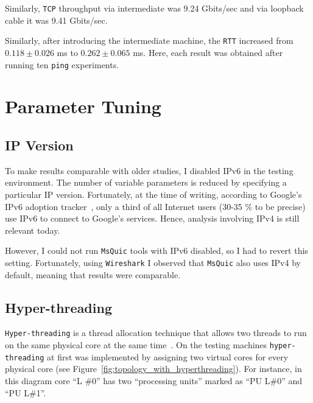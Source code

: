 \documentclass[12pt,a4paper]{report}
\begin{document}
    Similarly, \texttt{TCP} throughput via intermediate was 9.24 Gbits/sec and via loopback cable it was 9.41 Gbits/sec.


    Similarly, after introducing the intermediate machine, the \texttt{RTT} increased from
    $0.118 \pm 0.026$ ms to $0.262 \pm 0.065$ ms.
    Here, each result was obtained after running ten \texttt{ping} experiments.
    




\section{Parameter Tuning}

\subsection{IP Version}

To make results comparable with older studies, I disabled IPv6 in the testing environment.
The number of variable parameters is reduced by specifying a particular IP version.
Fortunately, at the time of writing, according to Google's IPv6 adoption tracker~\cite{IPv6_Adoption_Statistics}, only a third of all Internet users (30-35 \% to be precise) use IPv6 to connect to Google's services.
Hence, analysis involving IPv4 is still relevant today.

However, I could not run \texttt{MsQuic} tools with IPv6 disabled, so I had to revert this setting.
Fortunately, using \texttt{Wireshark} I observed that \texttt{MsQuic} also uses IPv4 by default, meaning that results were comparable.

\subsection{Hyper-threading}\label{Hyperthreading_Subsection_Tag}

\texttt{Hyper-threading} is a thread allocation technique that allows two threads to run on the same physical core at the same time~\cite[page~ 23]{hyperthreading_book}.
On the testing machines \texttt{hyper-threading} at first was implemented by assigning two virtual cores for every physical core (see Figure~\ref{fig:topology_with_hyperthreading}).
For instance, in this diagram core \enquote{L \#0} has two \enquote{processing units} marked as \enquote{PU L\#0} and \enquote{PU L\#1}.
\end{document}
